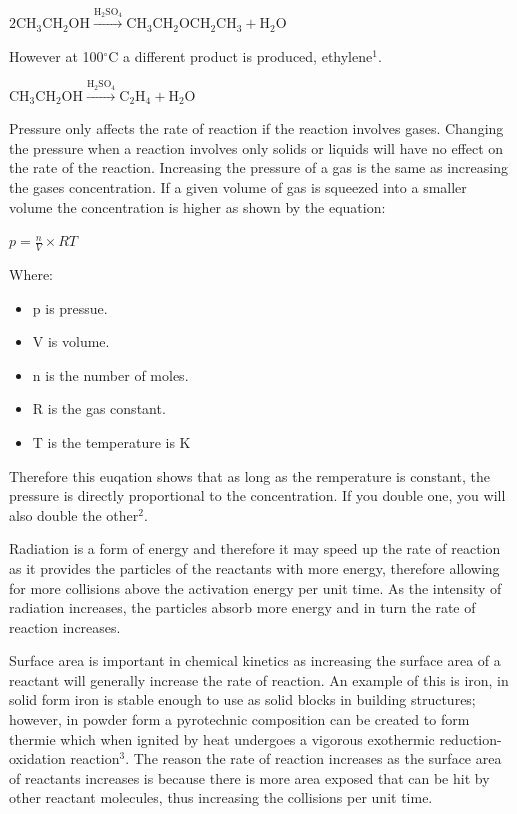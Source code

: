 $\mathrm{2CH_3CH_2OH}\xrightarrow{\mathrm{H_2SO_4}}\mathrm{CH_3CH_2OCH_2CH_3}+\mathrm{H_2O}$

However at 100$^{\circ}$C a different product is produced, ethylene$^1$.

$\mathrm{CH_3CH_2OH}\xrightarrow{\mathrm{H_2SO_4}}\mathrm{C_2H_4}+\mathrm{H_2O}$

Pressure only affects the rate of reaction if the reaction involves gases. Changing the pressure when a reaction involves only solids or liquids will have no effect on the rate of the reaction. Increasing the pressure of a gas is the same as increasing the gases concentration. If a given volume of gas is squeezed into a smaller volume the concentration is higher as shown by the equation:

 $p= \frac{n}{V}\times{RT}$

Where:
\begin{itemize}
\item p is pressue.
\item V is volume.
\item n is the number of moles.
\item R is the gas constant.
\item T is the temperature is K
\end{itemize}

Therefore this euqation shows that as long as the remperature is constant, the pressure is directly proportional to the concentration. If you double one, you will also double the other$^2$.

Radiation is a form of energy and therefore it may speed up the rate of reaction as it provides the particles of the reactants with more energy, therefore allowing for more collisions above the activation energy per unit time. As the intensity of radiation increases, the particles absorb more energy and in turn the rate of reaction increases.

Surface area is important in chemical kinetics as increasing the surface area of a reactant will generally increase the rate of reaction. An example of this is iron, in solid form iron is stable enough to use as solid blocks in building structures; however, in powder form a pyrotechnic composition can be created to form thermie which when ignited by heat undergoes a vigorous exothermic reduction-oxidation reaction$^3$. The reason the rate of reaction increases as the surface area of reactants increases is because there is more area exposed that can be hit by other reactant molecules, thus increasing the collisions per unit time.

